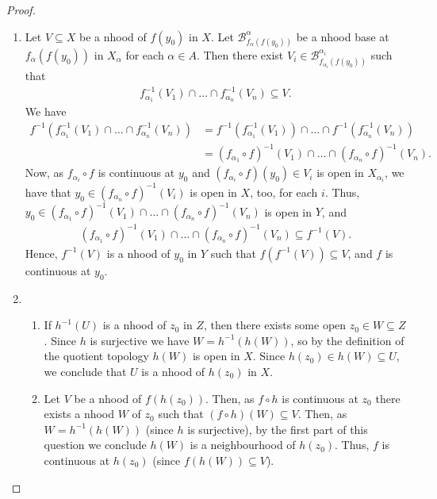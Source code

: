 \documentclass[12pt]{extarticle}
\newcommand{\<}{\langle}
\renewcommand{\>}{\rangle}
\theoremstyle{definition}
\begin{document}
\begin{proof}
  \begin{enumerate}
  \item
    Let $V \subseteq X$ be a nhood of $f(y_0)$ in $X$. Let $\mathcal{B}_{f_{\alpha}(f(y_0))}^{\alpha}$ be a nhood base at $f_{\alpha}(f(y_0))$ in $X_{\alpha}$ for each $\alpha \in A$.
    Then there exist $V_i \in  \mathcal{B}_{f_{\alpha_i}(f(y_0))}^{\alpha_i}$ such that 
    \begin{align*}
      f_{\alpha_1}^{-1}(V_1) \cap \dots \cap f_{\alpha_n}^{-1}(V_n) \subseteq V.
    \end{align*}
    We have
    \begin{align*}
      f^{-1}(f_{\alpha_1}^{-1}(V_1) \cap \dots \cap f_{\alpha_n}^{-1}(V_n))
      &= f^{-1}(f_{\alpha_1}^{-1}(V_1)) \cap \dots \cap f^{-1}(f_{\alpha_n}^{-1}(V_n)) \\
      &= (f_{\alpha_1} \circ f)^{-1}(V_1) \cap \dots \cap (f_{\alpha_n} \circ f)^{-1}(V_n).
    \end{align*}
    Now, as $f_{\alpha_i} \circ f$ is continuous at $y_0$ and $(f_{\alpha_i} \circ f)(y_0) \in V_i$ is open in $X_{\alpha_i}$, we have that $y_0 \in (f_{\alpha_n} \circ f)^{-1}(V_i)$ is open in $X$, too, for each $i$. Thus, $y_0 \in (f_{\alpha_1} \circ f)^{-1}(V_1) \cap \dots \cap (f_{\alpha_n} \circ f)^{-1}(V_n)$ is open in $Y$, and 
    \begin{align*}
      (f_{\alpha_1} \circ f)^{-1}(V_1) \cap \dots \cap (f_{\alpha_n} \circ f)^{-1}(V_n) \subseteq f^{-1}(V).
    \end{align*}
    Hence, $f^{-1}(V)$ is a nhood of $y_0$ in $Y$ such that $f(f^{-1}(V)) \subseteq V$, and $f$ is continuous at $y_0$. 
  \item
    \begin{enumerate}
    \item
      If $h^{-1}(U)$ is a nhood of $z_0$ in $Z$, then there exists some open $z_0 \in W \subseteq Z$.
      Since $h$ is surjective we have $W=h^{-1}(h(W))$, so by the definition of the quotient topology $h(W)$ is open in $X$.
      Since $h(z_0) \in h(W) \subseteq U$, we conclude that $U$ is a nhood of $h(z_0)$ in $X$.
    \item
      Let $V$ be a nhood of $f(h(z_0))$. Then, as $f \circ h$ is continuous at $z_0$ there exists a nhood $W$ of $z_0$ such that $(f \circ h)(W) \subseteq V$.
      Then, as $W = h^{-1}(h(W))$ (since $h$ is surjective), by the first part of this question we conclude $h(W)$ is a neighbourhood of $h(z_0)$.
      Thus, $f$ is continuous at $h(z_0)$ (since $f(h(W)) \subseteq V$). 
    \end{enumerate}
  \end{enumerate}
\end{proof}
\end{document}
